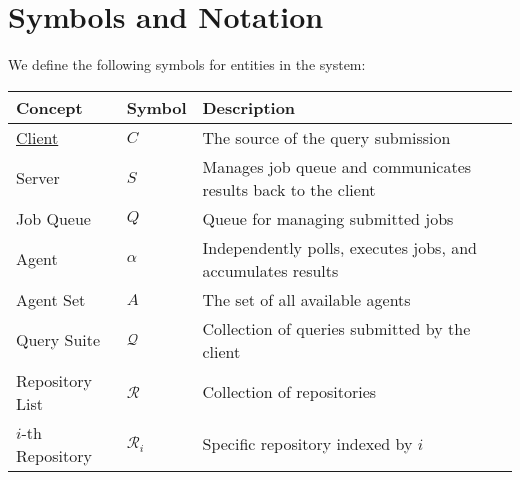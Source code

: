 \documentclass[11pt]{article}
\begin{document}
\section{Symbols and Notation}
\label{sec:orgb695d5a}

We define the following symbols for entities in the system:

\begin{center}
  \begin{tabular}{lll}
    Concept                                                                       & Symbol                            & Description                                                         \\[0pt]
    \hline
    \href{vscode://file//Users/hohn/work-gh/mrva/gh-mrva/README.org:39:1}{Client} & \(C\)                             & The source of the query submission                                  \\[0pt]
    Server                                                                        & \(S\)                             & Manages job queue and communicates results back to the client       \\[0pt]
    Job Queue                                                                     & \(Q\)                             & Queue for managing submitted jobs                                   \\[0pt]
    Agent                                                                         & \(\alpha\)                        & Independently polls, executes jobs, and accumulates results         \\[0pt]
    Agent Set                                                                     & \(A\)                             & The set of all available agents                                     \\[0pt]
    Query Suite                                                                   & \(\mathcal{Q}\)                   & Collection of queries submitted by the client                       \\[0pt]
    Repository List                                                               & \(\mathcal{R}\)                   & Collection of repositories                                          \\[0pt]
    \(i\)-th Repository                                                           & \(\mathcal{R}_i\)                 & Specific repository indexed by \(i\)                                \\[0pt]

\end{tabular}
\end{center}
\end{document}
